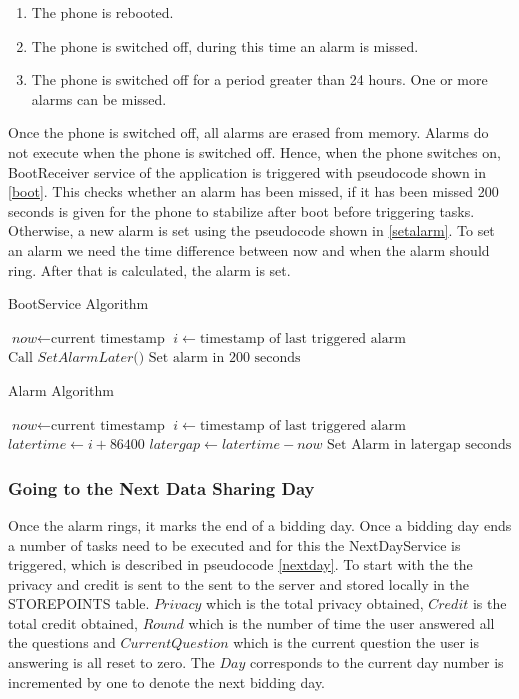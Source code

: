 \begin{enumerate}
	\item The phone is rebooted.
	\item The phone is switched off, during this time an alarm is missed.
    \item The phone is switched off for a period greater than 24 hours. One or more alarms can be missed.
\end{enumerate}

Once the phone is switched off, all alarms are erased from memory. Alarms do not execute when the phone is switched off. Hence, when the phone switches on,
BootReceiver service of the application is triggered with pseudocode shown in \ref{boot}. This checks whether an alarm has been missed, if it has been missed 200 seconds is given for the phone to stabilize after boot before triggering tasks. Otherwise, a new alarm is set using the pseudocode shown in \ref{setalarm}. To set an alarm we need the time difference between now and when the alarm should ring. After that is calculated, the alarm is set.

\begin{algorithm}
\caption{BootService Algorithm}\label{boot}
\begin{algorithmic}[1]
\State $\textit{now} \gets \text{current timestamp}$
\State $i \gets \text{timestamp of last triggered alarm}$
  \State $\text{Call }\textit{SetAlarmLater()}$
\Else
  \State $\text{Set alarm in 200 seconds}$
\EndIf
\EndProcedure
\end{algorithmic}
\end{algorithm}


\begin{algorithm}
\caption{Alarm Algorithm}\label{setalarm}
\begin{algorithmic}[1]
\State $\textit{now} \gets \text{current timestamp}$
\State $i \gets \text{timestamp of last triggered alarm}$
\State $\textit{latertime} \gets \textit{i}+\text{86400}$
\State $\textit{latergap} \gets \textit{latertime}-\textit{now}$
\State $\text{Set Alarm in latergap seconds}$
\EndProcedure
\end{algorithmic}
\end{algorithm}

\subsubsection{Going to the Next Data Sharing Day} \label{next}
Once the alarm rings, it marks the end of a bidding day. Once a bidding day ends a number of tasks need to be executed
and for this the NextDayService is triggered, which is described in pseudocode \ref{nextday}. To start with the the privacy and credit is sent to
the sent to the server and stored locally in the STOREPOINTS table. $Privacy$ which is the total privacy obtained, $Credit$ is the total credit obtained, $Round$ which is the number of time the user answered all the questions and $CurrentQuestion$ which is the current question the user is answering is all reset to zero. The $Day$ corresponds to the current day number is incremented by one to denote the next bidding day.


